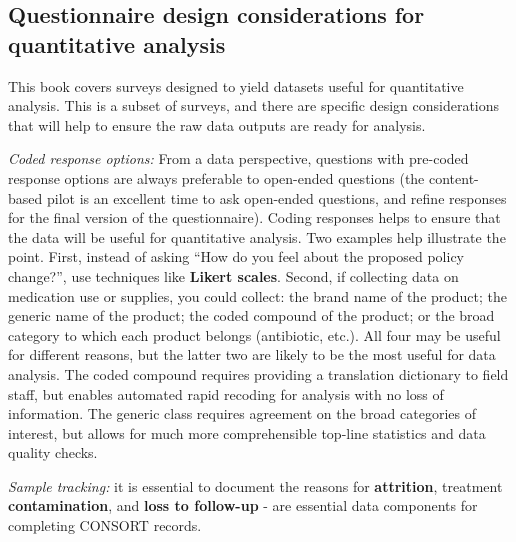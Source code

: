 \subsection{Questionnaire design considerations for quantitative analysis}
This book covers surveys designed to yield datasets useful for quantitative analysis. This is a subset of surveys, and there are specific design considerations that will help to ensure the raw data outputs are ready for analysis. 

\textit{Coded response options:}
From a data perspective, questions with pre-coded response options are always preferable to open-ended questions (the content-based pilot is an excellent time to ask open-ended questions, and refine responses for the final version of the questionnaire). Coding responses helps to ensure that the data will be useful for quantitative analysis. Two examples help illustrate the point. First, instead of asking ``How do you feel about the proposed policy change?'', use techniques like 
\textbf{Likert scales}. Second, if collecting data on medication use or supplies, you could collect: the brand name of the product; the generic name of the product; the coded compound of the product; or the broad category to which each product belongs (antibiotic, etc.). All four may be useful for different reasons, but the latter two are likely to be the most useful for data analysis. The coded compound requires providing a translation dictionary to field staff, but enables automated rapid recoding for analysis with no loss of information. The generic class requires agreement on the broad categories of interest, but allows for much more comprehensible top-line statistics and data quality checks.

\textit{Sample tracking:} it is essential to document the reasons for \textbf{attrition}, treatment \textbf{contamination}, and \textbf{loss to follow-up}  -
 are essential data components for completing CONSORT records. 

